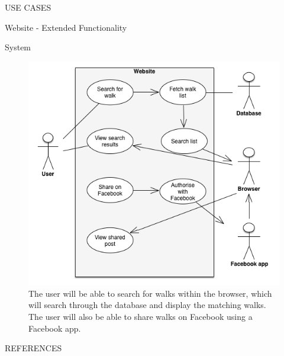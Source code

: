 \documentclass{article}
\begin{document}
\begin{section}{USE CASES}
		\clearpage
		\begin{subsection}{Website - Extended Functionality}
			\begin{subsubsection}{System}
				\begin{figure}[h!]
					\begin{center}
						\includegraphics[height=0.75\columnwidth]{images/UseCase/Website/Extended/Website.png}
					\end{center}
					\caption{The user will be able to search for walks within the browser, which will search through the database and display the matching walks. The user will also be able to share walks on Facebook using a Facebook app.}
				\end{figure}
			\end{subsubsection}
		\end{subsection}
	\end{section}

	\nocite{LaTeXTemplate}

	\newpage
	\begin{section}{REFERENCES}
		
		
	\end{section}
\end{document}
